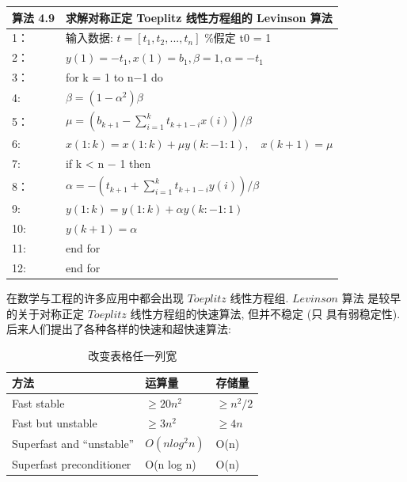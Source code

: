 \documentclass[12pt,a4paper]{article}
\begin{document}
\begin{table}  
	\begin{tabular*}{16cm}{ll}  
		\hline  
		算法 4.9 &求解对称正定 Toeplitz 线性方程组的 Levinson 算法\\  
		\hline  
		1：   & 输入数据: $t = [t_1, t_2, . . . , t_n]$ \%假定 t0 = 1\\  
		2：   & $y(1) = −t_1, x(1) = b_1, \beta=1,\alpha = −t_1$\\
		3：   & for k = 1 to n−1 do \\
		4:    & \qquad $\beta=(1-\alpha^2)\beta$\\
		5：    & \qquad $\mu=\left(b_{k+1}-\sum_{i=1}^{k} t_{k+1-i} x(i)\right) / \beta$\\
		6:    & \qquad $x(1 : k)=x(1 : k)+\mu y(k :-1 : 1), \quad x(k+1)=\mu$\\
		7:    &\qquad if k < n − 1 then\\
		8：   & \qquad \qquad $\alpha=-\left(t_{k+1}+\sum_{i=1}^{k} t_{k+1-i} y(i)\right) / \beta$\\
		9:    &\qquad \qquad $y(1 : k)=y(1 : k)+\alpha y(k :-1 : 1)$\\
		10:   &\qquad \qquad $y(k + 1) = \alpha$\\
		11:   & \qquad end for \\
		12:   &end for\\
		\hline  
	\end{tabular*}  
\end{table}

在数学与工程的许多应用中都会出现 $Toeplitz$ 线性方程组. $Levinson$ 算法
是较早的关于对称正定 $Toeplitz$ 线性方程组的快速算法, 但并不稳定 (只
具有弱稳定性). 后来人们提出了各种各样的快速和超快速算法:

\begin{table}[h] %
	\caption{改变表格任一列宽} %
	\begin{tabular}{p{3.5cm}|p{2cm}|p{5cm}} %
		\hline  
		\hline  
		方法 & 运算量 & 存储量 \\ %
		\hline %
		Fast stable & $≥ 20n^2$& $≥ n^2/2$\\  
		\hline  
		Fast but unstable & $≥ 3n^2$ & $≥ 4n$\\  
		\hline  
		Superfast and “unstable” & $O(n log^2n) $& O(n)\\  
		\hline  
		Superfast preconditioner & O(n log n) & O(n)\\  
		\hline  
		\hline  
	\end{tabular}  
\end{table} 
\end{document}
